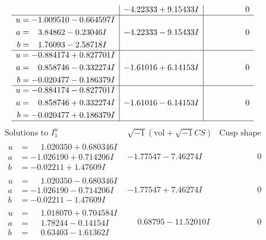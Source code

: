\documentclass[1p]{elsarticle_modified}
\theoremstyle{definition}
\newcommand{\I}{\sqrt{-1}}
\begin{document}
$$\begin{array}{c|c|c}
 & -4.22333 + 9.15433 I & \phantom{-0.000000 } 0 \\ \hline\begin{aligned}
u &= -1.009510 - 0.664597 I \\
a &= \phantom{-}3.84862 - 0.23046 I \\
b &= \phantom{-}1.76093 - 2.58718 I\end{aligned}
 & -4.22333 - 9.15433 I & \phantom{-0.000000 } 0 \\ \hline\begin{aligned}
u &= -0.884174 + 0.827701 I \\
a &= \phantom{-}0.858746 - 0.332274 I \\
b &= -0.020477 - 0.186379 I\end{aligned}
 & -1.61016 + 6.14153 I & \phantom{-0.000000 } 0 \\ \hline\begin{aligned}
u &= -0.884174 - 0.827701 I \\
a &= \phantom{-}0.858746 + 0.332274 I \\
b &= -0.020477 + 0.186379 I\end{aligned}
 & -1.61016 - 6.14153 I & \phantom{-0.000000 } 0\\
 \hline 
 \end{array}$$\newpage$$\begin{array}{c|c|c}  
\text{Solutions to }I^u_{1}& \I (\text{vol} + \sqrt{-1}CS) & \text{Cusp shape}\\
 \hline 
\begin{aligned}
u &= \phantom{-}1.020350 + 0.680346 I \\
a &= -1.026190 + 0.714206 I \\
b &= -0.02211 + 1.47609 I\end{aligned}
 & -1.77547 - 7.46274 I & \phantom{-0.000000 } 0 \\ \hline\begin{aligned}
u &= \phantom{-}1.020350 - 0.680346 I \\
a &= -1.026190 - 0.714206 I \\
b &= -0.02211 - 1.47609 I\end{aligned}
 & -1.77547 + 7.46274 I & \phantom{-0.000000 } 0 \\ \hline\begin{aligned}
u &= \phantom{-}1.018070 + 0.704584 I \\
a &= \phantom{-}1.78244 - 0.14154 I \\
b &= \phantom{-}0.63403 - 1.61362 I\end{aligned}
 & \phantom{-}0.68795 - 11.52010 I & \phantom{-0.000000 } 0 \\ \hline\begin{aligned}

\end{aligned}
\end{array}$$
\end{document}
